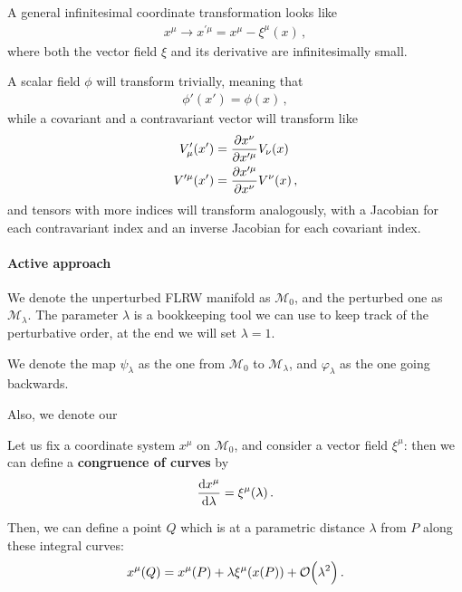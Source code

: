 \documentclass[main.tex]{subfiles}
\begin{document}

A general infinitesimal coordinate transformation looks like 
%
\begin{align}
x^{\mu } \to x^{\prime \mu } = x^{\mu } - \xi^{\mu }(x)
\,,
\end{align}
%
where both the vector field \(\xi \) and its derivative are infinitesimally small. 

A scalar field \(\phi \) will transform trivially, meaning that 
%
\begin{align}
\phi' (x') = \phi (x)
\,,
\end{align}
%
while a covariant and a contravariant vector will transform like 
%
\begin{align}
V^{\prime }_\mu (x') &= \pdv{x^{\nu }}{x^{\prime \mu }} V_\nu (x)  \\
V^{\prime \mu } (x') &= \pdv{x^{\prime \mu }}{x^{\nu }} V^{\nu }(x)
\,,
\end{align}
%
and tensors with more indices will transform analogously, with a Jacobian for each contravariant index and an inverse Jacobian for each covariant index. 

\paragraph{Active approach}

We denote the unperturbed FLRW manifold as \(\mathcal{M}_0\), and the perturbed one as \(\mathcal{M}_\lambda \). 
The parameter \(\lambda \) is a bookkeeping tool we can use to keep track of the perturbative order, at the end we will set \(\lambda = 1\). 

We denote the map \(\psi _\lambda \) as the one from \(\mathcal{M}_0\) to \(\mathcal{M}_\lambda \), and \(\varphi _\lambda \) as the one going backwards.  

Also, we denote our

Let us fix a coordinate system \(x^{\mu }\) on \(\mathcal{M}_0\), and consider a vector field \(\xi^{\mu }\): then we can define a \textbf{congruence of curves} by 
%
\begin{align}
\dv{x^{\mu }}{\lambda } = \xi^{\mu } (\lambda )
\,.
\end{align}

Then, we can define a point \(Q\) which is at a parametric distance \(\lambda \) from \(P\) along these integral curves: 
%
\begin{align} \label{eq:infinitesimal-point-transformation-active-approach}
x^{\mu } (Q) = x^{\mu } (P) + \lambda \xi ^{\mu } (x(P)) + \order{\lambda^2}
\,.
\end{align}
\end{document}
